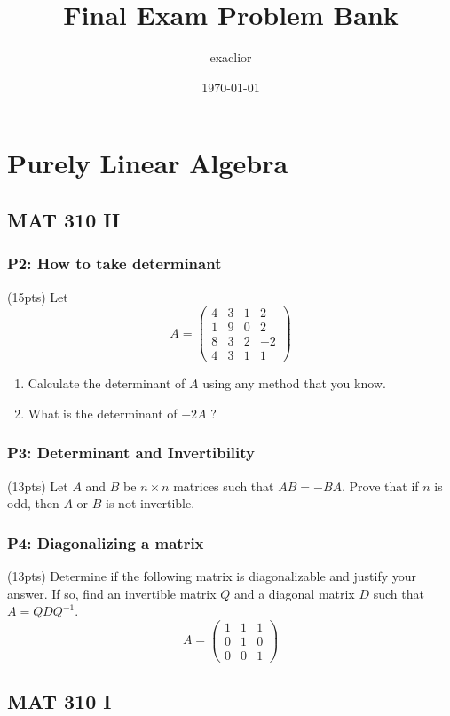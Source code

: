 \documentclass[11pt]{article}
\author{exaclior}
\date{\today}
\title{Final Exam Problem Bank}
\begin{document}
\maketitle
\tableofcontents

\section{Purely Linear Algebra}
\label{sec:org4052b47}
\subsection{MAT 310 II}
\label{sec:org7204c28}
\subsubsection{P2: How to take determinant}
\label{sec:org528afea}
(15pts) Let \[ A=\left(\begin{array}{cccc} 4 & 3 & 1 & 2 \\ 1 & 9 & 0 & 2 \\ 8 &
3 & 2 & -2 \\ 4 & 3 & 1 & 1 \end{array}\right) \]
\begin{enumerate}
\item Calculate the determinant of \(A\) using any method that you know.
\item What is the determinant of \(-2 A\) ?
\end{enumerate}
\subsubsection{P3: Determinant and Invertibility}
\label{sec:org28c7bc4}
(13pts) Let \(A\) and \(B\) be \(n \times n\) matrices such that \(A B=-B A\).
Prove that if \(n\) is odd, then \(A\) or \(B\) is not invertible.
\subsubsection{P4: Diagonalizing a matrix}
\label{sec:org2b0a90c}
(13pts) Determine if the following matrix is diagonalizable and justify your
answer. If so, find an invertible matrix \(Q\) and a diagonal matrix \(D\) such
that \(A=Q D Q^{-1}\).
\[ A=\left(\begin{array}{lll} 1 & 1 & 1 \\ 0 & 1 & 0 \\ 0
& 0 & 1 \end{array}\right) \]
\subsection{MAT 310 I}
\label{sec:org721d171}
\end{document}
